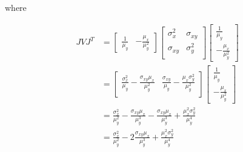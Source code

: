 \documentclass{article}
\theoremstyle{definition}
\begin{document}
where


\begin{align*}
    JVJ^T &= \begin{bmatrix}
\frac{1}{\mu_y} &  -\frac{\mu_x}{\mu_y^2}
\end{bmatrix} 
\begin{bmatrix}
    \sigma_x^2   &  \sigma_{xy}\\
    \sigma_{xy} & \sigma_y^2  \\
\end{bmatrix}
\begin{bmatrix}
\frac{1}{\mu_y} \\ -\frac{\mu_x}{\mu_y^2}
\end{bmatrix} \\ 
&=
\begin{bmatrix}
  \frac{\sigma_x^2}{\mu_y} - \frac{\sigma_{xy}\mu_x}{\mu_y^2}  & \frac{\sigma_{xy}}{\mu_y} - \frac{\mu_x\sigma_{y}^2}{\mu_y^2} \\
\end{bmatrix}
\begin{bmatrix}
\frac{1}{\mu_y} \\ -\frac{\mu_x}{\mu_y^2}
\end{bmatrix} \\ 
&=
  \frac{\sigma_x^2}{\mu_y^2} - \frac{\sigma_{xy}\mu_x}{\mu_y^3}  - \frac{\sigma_{xy}\mu_x}{\mu_y^3} + \frac{\mu_x^2\sigma_{y}^2}{\mu_y^4} \\
 &=
  \frac{\sigma_x^2}{\mu_y^2} - 2\frac{\sigma_{xy}\mu_x}{\mu_y^3}  + \frac{\mu_x^2\sigma_{y}^2}{\mu_y^4} \\
\end{align*}
\end{document}
